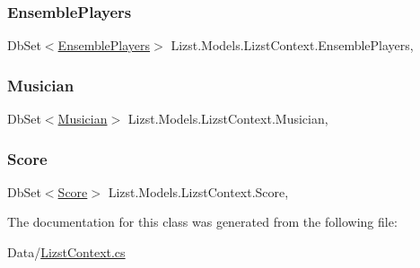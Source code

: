 \subsubsection{\texorpdfstring{EnsemblePlayers}{EnsemblePlayers}}
{\footnotesize\ttfamily Db\+Set$<$\mbox{\hyperlink{class_lizst_1_1_models_1_1_ensemble_players}{Ensemble\+Players}}$>$ Lizst.\+Models.\+Lizst\+Context.\+Ensemble\+Players\hspace{0.3cm}{\ttfamily [get]}, {\ttfamily [set]}}

\mbox{\label{class_lizst_1_1_models_1_1_lizst_context_a0bb99fe24a7f575f794d21c0aa5f3248}} 
\subsubsection{\texorpdfstring{Musician}{Musician}}
{\footnotesize\ttfamily Db\+Set$<$\mbox{\hyperlink{class_lizst_1_1_models_1_1_musician}{Musician}}$>$ Lizst.\+Models.\+Lizst\+Context.\+Musician\hspace{0.3cm}{\ttfamily [get]}, {\ttfamily [set]}}

\mbox{\label{class_lizst_1_1_models_1_1_lizst_context_a758a5c3cce37a033dffba6fa82c1ea8d}} 
\subsubsection{\texorpdfstring{Score}{Score}}
{\footnotesize\ttfamily Db\+Set$<$\mbox{\hyperlink{class_lizst_1_1_models_1_1_score}{Score}}$>$ Lizst.\+Models.\+Lizst\+Context.\+Score\hspace{0.3cm}{\ttfamily [get]}, {\ttfamily [set]}}



The documentation for this class was generated from the following file\+:\begin{DoxyCompactItemize}
\item 
Data/\mbox{\hyperlink{_lizst_context_8cs}{Lizst\+Context.\+cs}}\end{DoxyCompactItemize}
